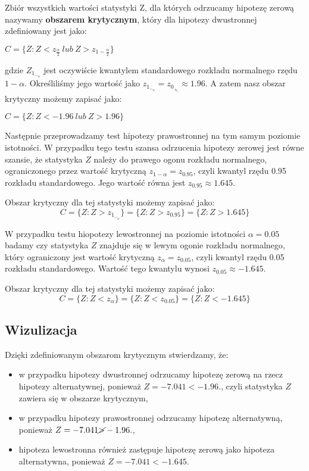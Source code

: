 \documentclass[12pt,letterpaper]{article}
\theoremstyle{definition}
\begin{document}
Zbiór wszystkich wartości statystyki Z, dla których odrzucamy hipotezę zerową nazywamy \textbf{obszarem krytycznym}, który dla hipotezy dwustronnej zdefiniowany jest jako:

\begin{center}
    $C=\{Z:Z < z_\frac{\alpha}{2} \ lub \  Z > z_{1-\frac{\alpha}{2}}\}$
\end{center}

gdzie $Z_1_-_\alpha$ jest oczywiście kwantylem standardowego rozkładu normalnego
rzędu $ 1 -\alpha$. Określiliśmy jego wartość jako $z_1_-_\alpha = z_0_._9_7_5 \approx 1.96.$ A zatem nasz obszar krytyczny możemy zapisać jako:
\begin{center}
    $C=\{Z:Z < -1.96 \ lub \  Z > 1.96\}$
\end{center}

Następnie przeprowadzamy test hipotezy prawostronnej na tym samym poziomie istotności. W przypadku tego testu szansa odrzucenia hipotezy zerowej jest równe szansie, że statystyka \(Z\) należy do prawego ogonu rozkładu normalnego, ograniczonego przez wartość krytyczną \(z_{1 − \alpha} = z_{0.95}\), czyli kwantyl rzędu 0.95 rozkładu standardowego. Jego wartość równa jest \(z_{0.95} \approx 1.645. \)

Obszar krytyczny dla tej statystyki możemy zapisać jako:
\[
C = \{Z : Z > z_1_-_{\alpha}\} = \{Z : Z > z_{0.95}\} = \{Z : Z > 1.645\}
\]

W przypadku testu hiopotezy lewostronnej na poziomie istotności  \(\alpha = 0.05\) badamy czy statystyka \(Z\) znajduje się w lewym ogonie rozkładu normalnego, który ograniczony jest wartość krytyczną \(z_{\alpha} = z_{0.05}\), czyli kwantyl rzędu 0.05 rozkładu standardowego. Wartość tego kwantylu wynosi \(z_{0.05} \approx -1.645. \)

Obszar krytyczny dla tej statystyki możemy zapisać jako:
\[
C = \{Z : Z < z_{\alpha} \} = \{Z : Z < z_{0.05}\} = \{Z : Z < -1.645\}
\]

\subsection{Wizulizacja}
Dzięki zdefiniowanym obszarom krytycznym stwierdzamy, że:
\begin{itemize}
    \item w przypadku hipotezy dwustronnej odrzucamy hipotezę zerową  na rzecz hipotezy alternatywnej, ponieważ \(Z = - 7.041 < - 1.96.\), czyli statystyka \(Z\) zawiera się w obszarze krytycznym,
    \item w przypadku hipotezy prawostronnej odrzucamy hipotezę alternatywną, ponieważ \(Z = - 7.041  \cancel{>}  - 1.96.\), 
    \item hipoteza lewostronna również zastępuje hipotezę zerową jako hipoteza alternatywna, ponieważ \(Z =  -7.041 <
- 1.645.\)
\end{itemize}
\end{document}
